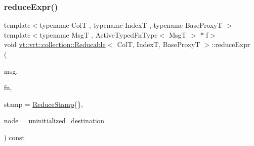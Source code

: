 \mbox{\label{structvt_1_1vrt_1_1collection_1_1_reducable_a7b9f5cc1f2155c547eef9af0c5149220}} 
\subsubsection{\texorpdfstring{reduce\+Expr()}{reduceExpr()}\hspace{0.1cm}{\footnotesize\ttfamily [1/2]}}
{\footnotesize\ttfamily template$<$typename ColT , typename IndexT , typename Base\+ProxyT $>$ \\
template$<$typename MsgT , Active\+Typed\+Fn\+Type$<$ Msg\+T $>$ $\ast$ f$>$ \\
void \hyperlink{structvt_1_1vrt_1_1collection_1_1_reducable}{vt\+::vrt\+::collection\+::\+Reducable}$<$ ColT, IndexT, Base\+ProxyT $>$\+::reduce\+Expr (\begin{DoxyParamCaption}\item[{MsgT $\ast$const}]{msg,  }\item[{\hyperlink{structvt_1_1vrt_1_1collection_1_1_reducable_a9f5a6c385efafe1fa52937f4809a9486}{Reduce\+Idx\+Func\+Type}}]{fn,  }\item[{\hyperlink{structvt_1_1vrt_1_1collection_1_1_reducable_a19f80baf23f36dad4948ef07322fd0cb}{Reduce\+Stamp}}]{stamp = {\ttfamily \hyperlink{structvt_1_1vrt_1_1collection_1_1_reducable_a19f80baf23f36dad4948ef07322fd0cb}{Reduce\+Stamp}\{\}},  }\item[{\hyperlink{namespacevt_a866da9d0efc19c0a1ce79e9e492f47e2}{Node\+Type} const \&}]{node = {\ttfamily uninitialized\+\_\+destination} }\end{DoxyParamCaption}) const}

\mbox{\label{structvt_1_1vrt_1_1collection_1_1_reducable_a8ab00b521ff7defd6ac2a864a08fc50d}} 
